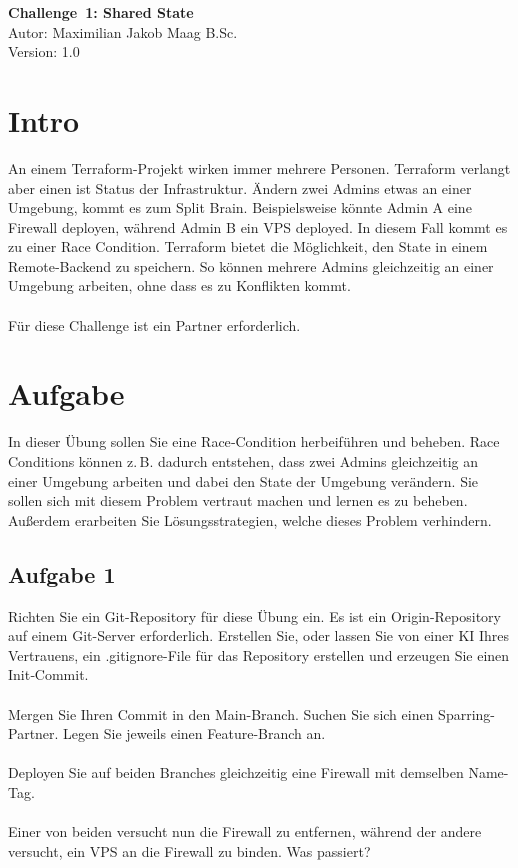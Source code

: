 \documentclass{article}
\begin{document}
    \begin{center}
        \Large \textbf{Challenge 1: Shared State} \\ [6pt]
        \normalsize
        Autor: Maximilian Jakob Maag B.Sc. \\
        Version: 1.0
    \end{center}
    \section{Intro}
    An einem Terraform-Projekt wirken immer mehrere Personen.
    Terraform verlangt aber einen ist Status der Infrastruktur. Ändern zwei Admins etwas an einer Umgebung, kommt es zum Split Brain.
    Beispielsweise könnte Admin A eine Firewall deployen, während Admin B ein VPS deployed. In diesem Fall kommt es zu einer Race Condition.
    Terraform bietet die Möglichkeit, den State in einem Remote‑Backend zu speichern. So können mehrere Admins gleichzeitig an einer Umgebung arbeiten, ohne dass es zu Konflikten kommt.
    \\ \\
    Für diese Challenge ist ein Partner erforderlich.

    \section{Aufgabe}
In dieser Übung sollen Sie eine Race‑Condition herbeiführen und beheben.
    Race Conditions können z. B. dadurch entstehen, dass zwei Admins gleichzeitig an einer Umgebung arbeiten und dabei den State der Umgebung verändern.
    Sie sollen sich mit diesem Problem vertraut machen und lernen es zu beheben. Außerdem erarbeiten Sie Lösungsstrategien, welche dieses Problem verhindern.

    \subsection{Aufgabe 1}
    Richten Sie ein Git-Repository für diese Übung ein. Es ist ein Origin-Repository auf einem Git-Server erforderlich.
    Erstellen Sie, oder lassen Sie von einer KI Ihres Vertrauens, ein .gitignore-File für das Repository erstellen und erzeugen Sie einen Init‑Commit.
    \\ \\
    Mergen Sie Ihren Commit in den Main-Branch. Suchen Sie sich einen Sparring-Partner. Legen Sie jeweils einen Feature-Branch an. \\ \\
    Deployen Sie auf beiden Branches gleichzeitig eine Firewall mit demselben Name-Tag. \\ \\
    Einer von beiden versucht nun die Firewall zu entfernen, während der andere versucht, ein VPS an die Firewall zu binden. Was passiert?
\end{document}
